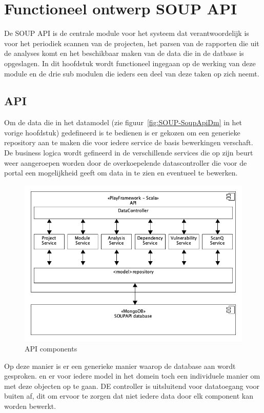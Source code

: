 \chapter{Functioneel ontwerp SOUP API}\label{ch:impl soup api}
De SOUP API is de centrale module voor het systeem dat verantwoordelijk is voor het periodiek scannen van de projecten, het parsen van de rapporten die uit de analyses komt en het beschikbaar maken van de data die in de datbase is opgeslagen. In dit hoofdstuk wordt functioneel ingegaan op de werking van deze module en de drie sub modulen die ieders een deel van deze taken op zich neemt.



\section{API}\label{sec:api}
Om de data die in het datamodel (zie figuur~\ref{fig:SOUP-SoupApiDm} in het vorige hoofdstuk) gedefineerd is te bedienen is er gekozen om een generieke repository aan te maken die voor iedere service de basis bewerkingen verschaft. De business logica wordt gefineerd in de verschillende services die op zijn beurt weer aangeroepen worden door de overkoepelende datascontroller die voor de portal een mogelijkheid geeft om data in te zien en eventueel te bewerken.
\begin{figure}[bth]
    \myfloatalign
    \includegraphics[width=12cm]{gfx/umlet/exports/API-ComponentsDiagram}
    \caption{API components }
    \label{fig:API components}
\end{figure}

Op deze manier is er een generieke manier waarop de database aan wordt gesproken. en er voor iedere model in het domein toch een individuele manier om met deze objecten op te gaan. DE controller is uitsluitend voor datatoegang voor buiten af, dit om ervoor te zorgen dat niet iedere data door elk component kan worden bewerkt.


